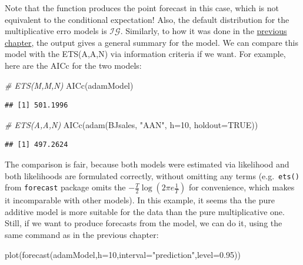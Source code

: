 \documentclass[
]{book}
\newenvironment{Shaded}{\begin{snugshade}}{\end{snugshade}}
\newcommand{\AttributeTok}[1]{\textcolor[rgb]{0.77,0.63,0.00}{#1}}
\newcommand{\CommentTok}[1]{\textcolor[rgb]{0.56,0.35,0.01}{\textit{#1}}}
\newcommand{\ConstantTok}[1]{\textcolor[rgb]{0.00,0.00,0.00}{#1}}
\newcommand{\DecValTok}[1]{\textcolor[rgb]{0.00,0.00,0.81}{#1}}
\newcommand{\FloatTok}[1]{\textcolor[rgb]{0.00,0.00,0.81}{#1}}
\newcommand{\FunctionTok}[1]{\textcolor[rgb]{0.00,0.00,0.00}{#1}}
\newcommand{\NormalTok}[1]{#1}
\newcommand{\StringTok}[1]{\textcolor[rgb]{0.31,0.60,0.02}{#1}}
\theoremstyle{definition}
\theoremstyle{definition}
\theoremstyle{definition}
\theoremstyle{definition}
\theoremstyle{remark}
\begin{document}
Note that the function produces the point forecast in this case, which is not equivalent to the conditional expectation! Also, the default distribution for the multiplicative erro models is \(\mathcal{IG}\). Similarly, to how it was done in the \protect\hyperlink{ADAMETSPureAdditiveExamples}{previous chapter}, the output gives a general summary for the model. We can compare this model with the ETS(A,A,N) via information criteria if we want. For example, here are the AICc for the two models:

\begin{Shaded}
\begin{Highlighting}[]
\CommentTok{\# ETS(M,M,N)}
\FunctionTok{AICc}\NormalTok{(adamModel)}
\end{Highlighting}
\end{Shaded}

\begin{verbatim}
## [1] 501.1996
\end{verbatim}

\begin{Shaded}
\begin{Highlighting}[]
\CommentTok{\# ETS(A,A,N)}
\FunctionTok{AICc}\NormalTok{(}\FunctionTok{adam}\NormalTok{(BJsales, }\StringTok{"AAN"}\NormalTok{, }\AttributeTok{h=}\DecValTok{10}\NormalTok{, }\AttributeTok{holdout=}\ConstantTok{TRUE}\NormalTok{))}
\end{Highlighting}
\end{Shaded}

\begin{verbatim}
## [1] 497.2624
\end{verbatim}

The comparison is fair, because both models were estimated via likelihood and both likelihoods are formulated correctly, without omitting any terms (e.g.~\texttt{ets()} from \texttt{forecast} package omits the \(-\frac{T}{2} \log\left(2\pi e \frac{1}{T}\right)\) for convenience, which makes it incomparable with other models). In this example, it seems tha the pure additive model is more suitable for the data than the pure multiplicative one. Still, if we want to produce forecasts from the model, we can do it, using the same command as in the previous chapter:

\begin{Shaded}
\begin{Highlighting}[]
\FunctionTok{plot}\NormalTok{(}\FunctionTok{forecast}\NormalTok{(adamModel,}\AttributeTok{h=}\DecValTok{10}\NormalTok{,}\AttributeTok{interval=}\StringTok{"prediction"}\NormalTok{,}\AttributeTok{level=}\FloatTok{0.95}\NormalTok{))}
\end{Highlighting}
\end{Shaded}
\end{document}
